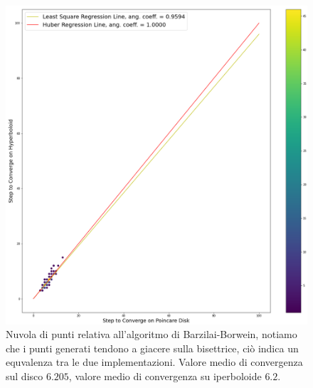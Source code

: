 \documentclass[a4paper, 12pt]{article}
\begin{document}
\begin{figure}[t] %
    \centering\includegraphics[width=1\textwidth]{barzilai_borwein.png}
    \caption{Nuvola di punti relativa all'algoritmo di Barzilai-Borwein, notiamo che i punti generati tendono a giacere sulla bisettrice, ciò indica un equvalenza tra le due implementazioni. Valore medio di convergenza sul disco $6.205$, valore medio di convergenza su iperboloide $6.2$.}
\end{figure}
\end{document}
